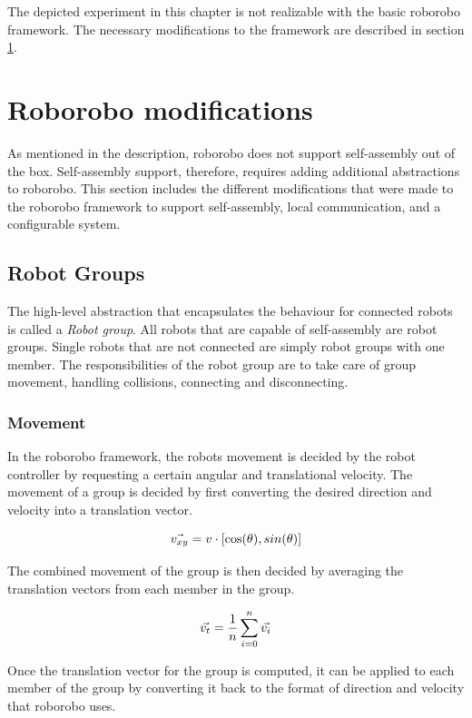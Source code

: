 The depicted experiment in this chapter is not realizable with the basic roborobo framework.
The necessary modifications to the framework are described in section \ref{sec:modifications}.

\section{Roborobo modifications}
\label{sec:modifications}
As mentioned in the description, roborobo does not support self-assembly out of the box.
Self-assembly support, therefore, requires adding additional abstractions to roborobo.
This section includes the different modifications that were made to the roborobo framework to support self-assembly, local communication, and a configurable system.

\subsection{Robot Groups}
The high-level abstraction that encapsulates the behaviour for connected robots is called a \emph{Robot group}.
All robots that are capable of self-assembly are robot groups.
Single robots that are not connected are simply robot groups with one member.
The responsibilities of the robot group are to take care of group movement, handling collisions, connecting and disconnecting. 
	
\subsubsection{Movement}
In the roborobo framework, the robots movement is decided by the robot controller by requesting a certain angular and translational velocity.
The movement of a group is decided by first converting the desired direction and velocity into a translation vector.

\begin{equation}
\centering
\vec{v_{xy}} = v\cdot[\cos(\theta), sin(\theta)]
\end{equation}

The combined movement of the group is then decided by averaging the translation vectors from each member in the group.

\begin{equation}
\centering
\vec{v_t} = \frac{1}{n}\sum_{i=0}^{n} \vec{v_{i}}
\end{equation}

Once the translation vector for the group is computed, it can be applied to each member of the group by converting it back to the format of direction and velocity that roborobo uses.

